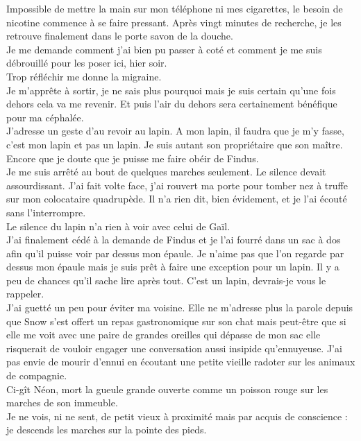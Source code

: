 Impossible de mettre la main sur mon téléphone ni mes cigarettes, le besoin de nicotine commence à se faire pressant. Après vingt minutes de recherche, je les retrouve finalement dans le porte savon de la douche. \\
Je me demande comment j'ai bien pu passer à coté et comment je me suis débrouillé pour les poser ici, hier soir. \\
Trop réfléchir me donne la migraine. \\

Je m’apprête à sortir, je ne sais plus pourquoi mais je suis certain qu'une fois dehors cela va me revenir. Et puis l'air du dehors sera certainement bénéfique pour ma céphalée. \\
J'adresse un geste d'au revoir au lapin. A mon lapin, il faudra que je m'y fasse, c'est mon lapin et pas un lapin. Je suis autant son propriétaire que son maître. Encore que je doute que je puisse me faire obéir de Findus. \\

Je me suis arrêté au bout de quelques marches seulement. Le silence devait assourdissant. J'ai fait volte face, j'ai rouvert ma porte pour tomber nez à truffe sur mon colocataire quadrupède. Il n'a rien dit, bien évidement, et je l'ai écouté sans l’interrompre. \\
Le silence du lapin n'a rien à voir avec celui de Gaïl. \\

J'ai finalement cédé à la demande de Findus et je l'ai fourré dans un sac à dos afin qu'il puisse voir par dessus mon épaule. Je n'aime pas que l'on regarde par dessus mon épaule mais je suis prêt à faire une exception pour un lapin. Il y a peu de chances qu'il sache lire après tout. C'est un lapin, devrais-je vous le rappeler. \\

J'ai guetté un peu pour éviter ma voisine. Elle ne m'adresse plus la parole depuis que Snow s'est offert un repas gastronomique sur son chat mais peut-être que si elle me voit avec une paire de grandes oreilles qui dépasse de mon sac elle risquerait de vouloir engager une conversation aussi insipide qu'ennuyeuse. J'ai pas envie de mourir d'ennui en écoutant une petite vieille radoter sur les animaux de compagnie. \\
Ci-gît Néon, mort la gueule grande ouverte comme un poisson rouge sur les marches de son immeuble.\\
Je ne vois, ni ne sent, de petit vieux à proximité mais par acquis de conscience : je descends les marches sur la pointe des pieds. \\

